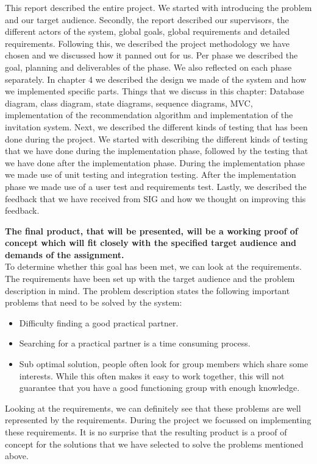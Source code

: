 This report described the entire project.
We started with introducing the problem and our target audience.
Secondly, the report described our supervisors, the different actors of the system, global goals, global requirements and detailed requirements.
Following this, we described the project methodology we have chosen and we discussed how it panned out for us.
Per phase we described the goal, planning and deliverables of the phase.
We also reflected on each phase separately.
In chapter 4 we described the design we made of the system and how we implemented specific parts.
Things that we discuss in this chapter: Database diagram, class diagram, state diagrams, sequence diagrams, MVC, implementation of the recommendation algorithm and implementation of the invitation system.
Next, we described the different kinds of testing that has been done during the project.
We started with describing the different kinds of testing that we have done during the implementation phase, followed by the testing that we have done after the implementation phase.
During the implementation phase we made use of unit testing and integration testing.
After the implementation phase we made use of a user test and requirements test.
Lastly, we described the feedback that we have received from SIG and how we thought on improving this feedback.

\textbf{The final product, that will be presented, will be a working proof of concept which will fit closely with the specified target audience and demands of the assignment.}\\
To determine whether this goal has been met, we can look at the requirements.
The requirements have been set up with the target audience and the problem description in mind.
The problem description states the following important problems that need to be solved by the system:
\begin{itemize}
\item Difficulty finding a good practical partner.
\item Searching for a practical partner is a time consuming process.
\item Sub optimal solution, people often look for group members which share some interests.
While this often makes it easy to work together, this will not guarantee that you have a good functioning group with enough knowledge.
\end{itemize}

Looking at the requirements, we can definitely see that these problems are well represented by the requirements.
During the project we focussed on implementing these requirements.
It is no surprise that the resulting product is a proof of concept for the solutions that we have selected to solve the problems mentioned above.

